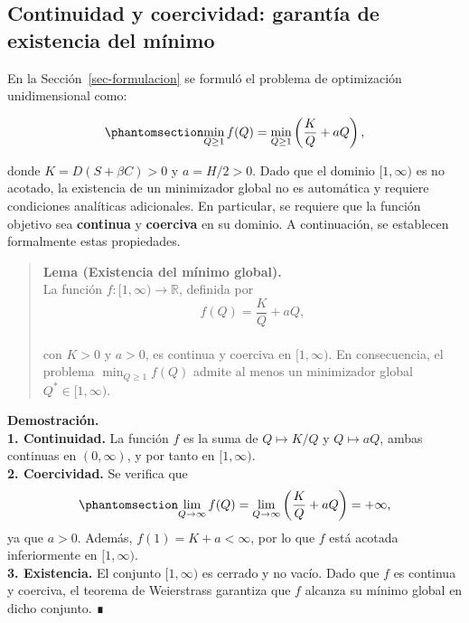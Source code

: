 \documentclass[
  spanish,
  us-letterpaper,
]{scrreprt}
\numberwithin{equation}{section}
\begin{document}
\subsection{Continuidad y coercividad: garantía de existencia del
mínimo}\label{sec-cyc}

En la Sección~\ref{sec-formulacion} se formuló el problema de
optimización unidimensional como:

\begin{equation}\phantomsection\label{eq-prob_25_1}{
\min_{Q \geq 1} f(Q) = \min_{Q \geq 1} \left( \frac{K}{Q} + a Q \right),
}\end{equation}

donde \(K = D(S + \beta C) > 0\) y \(a = H/2 > 0\). Dado que el dominio
\([1, \infty)\) es no acotado, la existencia de un minimizador global no
es automática y requiere condiciones analíticas adicionales. En
particular, se requiere que la función objetivo sea \textbf{continua} y
\textbf{coerciva} en su dominio. A continuación, se establecen
formalmente estas propiedades.

\begin{quote}
\textbf{Lema (Existencia del mínimo global).}\\
La función \(f : [1, \infty) \to \mathbb{R}\), definida por\\
\[
f(Q) = \frac{K}{Q} + a Q,
\]\\
con \(K > 0\) y \(a > 0\), es continua y coerciva en \([1, \infty)\). En
consecuencia, el problema \(\min_{Q \geq 1} f(Q)\) admite al menos un
minimizador global \(Q^* \in [1, \infty)\).
\end{quote}

\textbf{Demostración.}\\
\textbf{1. Continuidad.} La función \(f\) es la suma de
\(Q \mapsto K/Q\) y \(Q \mapsto aQ\), ambas continuas en
\((0, \infty)\), y por tanto en \([1, \infty)\).\\
\textbf{2. Coercividad.} Se verifica que
\begin{equation}\phantomsection\label{eq-lim_coercivo}{
\lim_{Q \to \infty} f(Q) = \lim_{Q \to \infty} \left( \frac{K}{Q} + a Q \right) = +\infty,
}\end{equation} ya que \(a > 0\). Además, \(f(1) = K + a < \infty\), por
lo que \(f\) está acotada inferiormente en \([1, \infty)\).\\
\textbf{3. Existencia.} El conjunto \([1, \infty)\) es cerrado y no
vacío. Dado que \(f\) es continua y coerciva, el teorema de Weierstrass
garantiza que \(f\) alcanza su mínimo global en dicho conjunto. ∎
\end{document}
